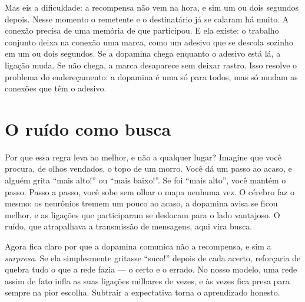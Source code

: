 Mas eis a dificuldade: a recompensa não vem na hora, e sim um ou dois segundos depois. Nesse momento o remetente e o destinatário já se calaram há muito. A conexão precisa de uma memória de que participou. E ela existe: o trabalho conjunto deixa na conexão uma marca, como um adesivo que se descola sozinho em um ou dois segundos. Se a dopamina chega enquanto o adesivo está lá, a ligação muda. Se não chega, a marca desaparece sem deixar rastro. Isso resolve o problema do endereçamento: a dopamina é uma só para todos, mas só mudam as conexões que têm o adesivo.


\section*{O ruído como busca}

Por que essa regra leva ao melhor, e não a qualquer lugar? Imagine que você procura, de olhos vendados, o topo de um morro. Você dá um passo ao acaso, e alguém grita ``mais alto!'' ou ``mais baixo!''. Se foi ``mais alto'', você mantém o passo. Passo a passo, você sobe sem olhar o mapa nenhuma vez. O cérebro faz o mesmo: os neurônios tremem um pouco ao acaso, a dopamina avisa se ficou melhor, e as ligações que participaram se deslocam para o lado vantajoso. O ruído, que atrapalhava a transmissão de mensagens, aqui vira busca.

Agora fica claro por que a dopamina comunica não a recompensa, e sim a \emph{surpresa}. Se ela simplesmente gritasse ``suco!'' depois de cada acerto, reforçaria de quebra tudo o que a rede fazia --- o certo e o errado. No nosso modelo, uma rede assim de fato infla as suas ligações milhares de vezes, e às vezes fica presa para sempre na pior escolha. Subtrair a expectativa torna o aprendizado honesto.

